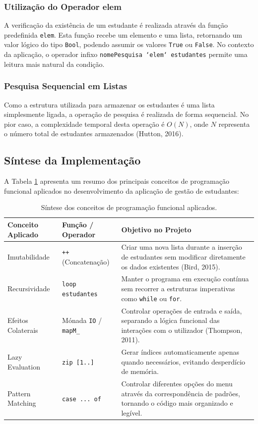 \documentclass[12pt,a4paper]{article}
\begin{document}
\subsubsection*{Utilização do Operador elem}
A verificação da existência de um estudante é realizada através da função predefinida \texttt{elem}. Esta função recebe um elemento e uma lista, retornando um valor lógico do tipo \texttt{Bool}, podendo assumir os valores \texttt{True} ou \texttt{False}. No contexto da aplicação, o operador infixo \texttt{nomePesquisa `elem` estudantes} permite uma leitura mais natural da condição.

\subsubsection*{Pesquisa Sequencial em Listas}
Como a estrutura utilizada para armazenar os estudantes é uma lista simplesmente ligada, a operação de pesquisa é realizada de forma sequencial. No pior caso, a complexidade temporal desta operação é $O(N)$, onde $N$ representa o número total de estudantes armazenados (Hutton, 2016).

\subsection{Síntese da Implementação}
A Tabela \ref{tab:sintese} apresenta um resumo dos principais conceitos de programação funcional aplicados no desenvolvimento da aplicação de gestão de estudantes:

\begin{table}[h!]
\centering
\begin{tabular}{|l|l|p{7.5cm}|}
\hline
\textbf{Conceito Aplicado} & \textbf{Função / Operador} & \textbf{Objetivo no Projeto} \\ \hline
Imutabilidade & \texttt{++} (Concatenação) & Criar uma nova lista durante a inserção de estudantes sem modificar diretamente os dados existentes (Bird, 2015). \\ \hline
Recursividade & \texttt{loop estudantes} & Manter o programa em execução contínua sem recorrer a estruturas imperativas como \texttt{while} ou \texttt{for}. \\ \hline
Efeitos Colaterais & Mónada \texttt{IO} / \texttt{mapM\_} & Controlar operações de entrada e saída, separando a lógica funcional das interações com o utilizador (Thompson, 2011). \\ \hline
Lazy Evaluation & \texttt{zip [1..]} & Gerar índices automaticamente apenas quando necessários, evitando desperdício de memória. \\ \hline
Pattern Matching & \texttt{case ... of} & Controlar diferentes opções do menu através da correspondência de padrões, tornando o código mais organizado e legível. \\ \hline
\end{tabular}
\caption{Síntese dos conceitos de programação funcional aplicados.}
\label{tab:sintese}
\end{table}
\end{document}

